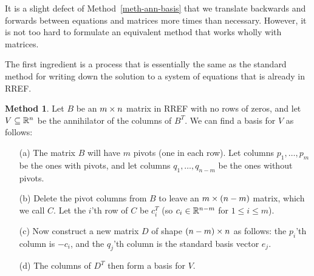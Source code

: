 \documentclass[reqno]{amsart}
\theoremstyle{definition}
\newtheorem{method}[theorem]{Method}
\begin{document}
It is a slight defect of Method~\ref{meth-ann-basis} that we translate
backwards and forwards between equations and matrices more times than
necessary.  However, it is not too hard to formulate an equivalent
method that works wholly with matrices.

The first ingredient is a process that is essentially the same as the
standard method for writing down the solution to a system of equations
that is already in RREF.

\begin{method}\label{meth-ann-basis-RREF}
 Let $B$ be an $m\times n$ matrix in RREF with no rows of zeros, and let
 $V\subseteq{\mathbb{R}}^n$ be the annihilator of the columns of $B^T$.  We can find
 a basis for $V$ as follows:
 \begin{itemize}
  \item[(a)] The matrix $B$ will have $m$ pivots (one in each row).
   Let columns $p_1,\dotsc,p_m$ be the ones with pivots, and let
   columns $q_1,\dotsc,q_{n-m}$ be the ones without pivots.
  \item[(b)] Delete the pivot columns from $B$ to leave an $m\times(n-m)$
   matrix, which we call $C$.  Let the $i$'th row of $C$ be $c_i^T$
   (so $c_i\in{\mathbb{R}}^{n-m}$ for $1\leq i\leq m$).
  \item[(c)] Now construct a new matrix $D$ of shape $(n-m)\times n$ as
   follows: the $p_i$'th column is $-c_i$, and the $q_j$'th column is
   the standard basis vector $e_j$.
  \item[(d)] The columns of $D^T$ then form a basis for $V$.
 \end{itemize}
\end{method}
\end{document}
